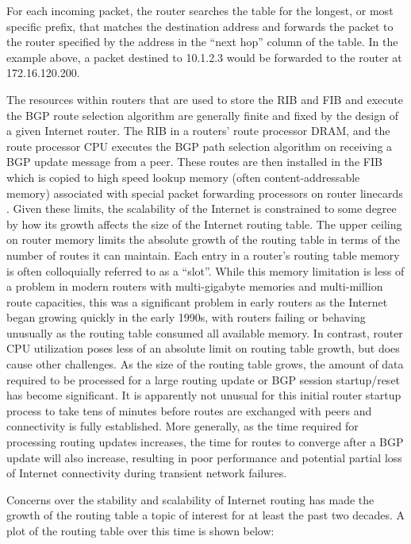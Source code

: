 For each incoming packet, the router searches the table for the longest, or most specific prefix, that matches the destination address and forwards the packet to the router specified by the address in the ``next hop'' column of the table. In the example above, a packet destined to 10.1.2.3 would be forwarded to the router at 172.16.120.200.

The resources within routers that are used to store the RIB and FIB and execute the BGP route selection algorithm are generally finite and fixed by the design of a given Internet router. The RIB in a routers' route processor DRAM, and the route processor CPU executes the BGP path selection algorithm on receiving a BGP update message from a peer. These routes are then installed in the FIB which is copied to high speed lookup memory (often content-addressable memory) associated with special packet forwarding processors on router linecards \cite{Zhao:2010fu}. Given these limits, the scalability of the Internet is constrained to some degree by how its growth affects the size of the Internet routing table. The upper ceiling on router memory limits the absolute growth of the routing table in terms of the number of routes it can maintain. Each entry in a router's routing table memory is often colloquially referred to as a ``slot''. While this memory limitation is less of a problem in modern routers with multi-gigabyte memories and multi-million route capacities, this was a significant problem in early routers as the Internet began growing quickly in the early 1990s, with routers failing or behaving unusually as the routing table consumed all available memory. In contrast, router CPU utilization poses less of an absolute limit on routing table growth, but does cause other challenges. As the size of the routing table grows, the amount of data required to be processed for a large routing update or BGP session startup/reset has become significant. It is apparently not unusual for this initial router startup process to take tens of minutes \cite{Steenbergen:2010nx} before routes are exchanged with peers and connectivity is fully established. More generally, as the time required for processing routing updates increases, the time for routes to converge after a BGP update will also increase, resulting in poor performance and potential partial loss of Internet connectivity during transient network failures.

Concerns over the stability and scalability of Internet routing has made the growth of the routing table a topic of interest for at least the past two decades. A plot of the routing table over this time is shown below:

